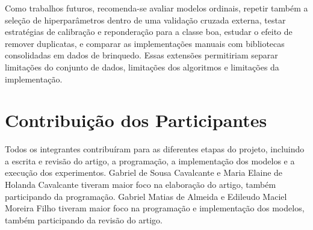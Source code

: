 \documentclass[12pt,a4paper]{article}
\begin{document}
Como trabalhos futuros, recomenda-se avaliar modelos ordinais, repetir tamb\'em a sele\c{c}\~ao de hiperpar\^ametros dentro de uma valida\c{c}\~ao cruzada externa, testar estrat\'egias de calibra\c{c}\~ao e repondera\c{c}\~ao para a classe boa, estudar o efeito de remover duplicatas, e comparar as implementa\c{c}\~oes manuais com bibliotecas consolidadas em dados de brinquedo. Essas extens\~oes permitiriam separar limita\c{c}\~oes do conjunto de dados, limita\c{c}\~oes dos algoritmos e limita\c{c}\~oes da implementa\c{c}\~ao.

\section*{Contribui\c{c}\~ao dos Participantes}

Todos os integrantes contribu\'iram para as diferentes etapas do projeto, incluindo a escrita e revis\~ao do artigo, a programa\c{c}\~ao, a implementa\c{c}\~ao dos modelos e a execu\c{c}\~ao dos experimentos. Gabriel de Sousa Cavalcante e Maria Elaine de Holanda Cavalcante tiveram maior foco na elabora\c{c}\~ao do artigo, tamb\'em participando da programa\c{c}\~ao. Gabriel Matias de Almeida e Edileudo Maciel Moreira Filho tiveram maior foco na programa\c{c}\~ao e implementa\c{c}\~ao dos modelos, tamb\'em participando da revis\~ao do artigo.
\end{document}
